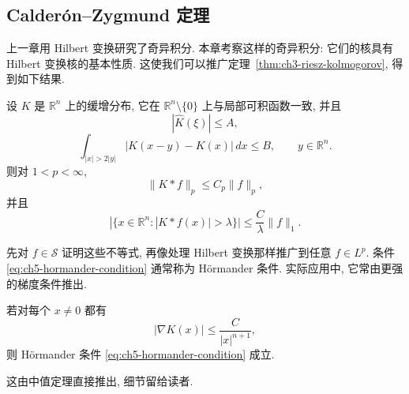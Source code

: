 \hypertarget{chapter-05-page-103}{}
\subsection{Calderón--Zygmund 定理}
\label{sec:ch5-calderon-zygmund-theorem}

上一章用 Hilbert 变换研究了奇异积分. 本章考察这样的奇异积分: 它们的核具有 Hilbert 变换核的基本性质. 这使我们可以推广定理~\ref{thm:ch3-riesz-kolmogorov}, 得到如下结果.

\begin{Theorem}
\label{thm:ch5-calderon-zygmund}
设 $K$ 是 $\mathbb R^n$ 上的缓增分布, 它在 $\mathbb R^n\setminus\{0\}$ 上与局部可积函数一致, 并且
\begin{equation}
\label{eq:ch5-bounded-fourier-kernel}
 |\widehat K(\xi)|\le A,
\end{equation}
\begin{equation}
\label{eq:ch5-hormander-condition}
 \int_{|x|>2|y|}|K(x-y)-K(x)|\,dx\le B,
 \qquad y\in\mathbb R^n.
\end{equation}
则对 $1<p<\infty$,
\[
 \|K*f\|_p\le C_p\|f\|_p,
\]
并且
\[
 |\{x\in\mathbb R^n:|K*f(x)|>\lambda\}|
 \le\frac C\lambda\|f\|_1.
\]
\end{Theorem}

先对 $f\in\mathcal S$ 证明这些不等式, 再像处理 Hilbert 变换那样推广到任意 $f\in L^p$. 条件 \eqref{eq:ch5-hormander-condition} 通常称为 Hörmander 条件. 实际应用中, 它常由更强的梯度条件推出.

\hypertarget{chapter-05-page-104}{}
\begin{Proposition}
\label{prop:ch5-gradient-implies-hormander}
若对每个 $x\ne0$ 都有
\begin{equation}
\label{eq:ch5-gradient-condition}
 |\nabla K(x)|\le\frac C{|x|^{n+1}},
\end{equation}
则 Hörmander 条件 \eqref{eq:ch5-hormander-condition} 成立.
\end{Proposition}

这由中值定理直接推出, 细节留给读者.

